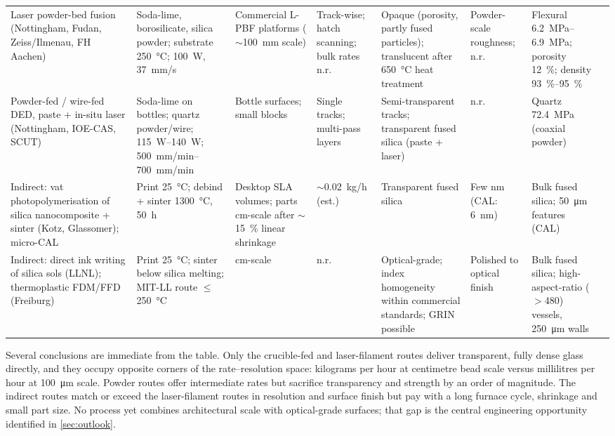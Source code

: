\begin{table}
\begin{tabular}{@{}L{2.6cm}L{2.3cm}L{2.4cm}L{2.5cm}L{2.6cm}L{2.5cm}L{3.0cm}L{2.2cm}@{}}
    Laser powder-bed fusion (Nottingham, Fudan, Zeiss/Ilmenau, FH Aachen) & Soda-lime, borosilicate, silica powder; substrate \SI{250}{\celsius}; \SI{100}{W}, \SI{37}{mm/s} & Commercial L-PBF platforms (\(\sim\)\SI{100}{mm} scale) & Track-wise; hatch scanning; bulk rates n.r. & Opaque (porosity, partly fused particles); translucent after \SI{650}{\celsius} heat treatment & Powder-scale roughness; n.r. & Flexural \SIrange{6.2}{6.9}{MPa}; porosity \SI{12}{\percent}; density \SIrange{93}{95}{\percent} & \citep{datsiou2019,datsiou2021,slmirregular2023,boro2025laser,fateri2015}\\
    Powder-fed / wire-fed DED, paste + in-situ laser (Nottingham, IOE-CAS, SCUT) & Soda-lime on bottles; quartz powder/wire; \SIrange{115}{140}{W}; \SIrange{500}{700}{mm/min} & Bottle surfaces; small blocks & Single tracks; multi-pass layers & Semi-transparent tracks; transparent fused silica (paste + laser) & n.r. & Quartz \SI{72.4}{MPa} (coaxial powder) & \citep{spirrett2023,lang2024,lgd2025tempctrl,paste2024,ieee2019dlm}\\
    \midrule
    Indirect: vat photopolymerisation of silica nanocomposite + sinter (Kotz, Glassomer); micro-CAL & Print \SI{25}{\celsius}; debind + sinter \SI{1300}{\celsius}, \SI{50}{h} & Desktop SLA volumes; parts cm-scale after \(\sim\)\SI{15}{\percent} linear shrinkage & \(\sim\)\SI{0.02}{kg/h} (est.) & Transparent fused silica & Few nm (CAL: \SI{6}{nm}) & Bulk fused silica; \SI{50}{\micro\metre} features (CAL) & \citep{kotz2017,toombs2022,inamura2018}\\
    Indirect: direct ink writing of silica sols (LLNL); thermoplastic FDM/FFD (Freiburg) & Print \SI{25}{\celsius}; sinter below silica melting; MIT-LL route \(\le\)\SI{250}{\celsius} & cm-scale & n.r. & Optical-grade; index homogeneity within commercial standards; GRIN possible & Polished to optical finish & Bulk fused silica; high-aspect-ratio (\(>\)480) vessels, \SI{250}{\micro\metre} walls & \citep{nguyen2017,destino2018,mader2021,acers2024recent}\\
    \bottomrule
  \end{tabular}
\end{table}

Several conclusions are immediate from the table. Only the crucible-fed and laser-filament routes deliver transparent, fully dense glass directly, and they occupy opposite corners of the rate--resolution space: kilograms per hour at centimetre bead scale versus millilitres per hour at \SI{100}{\micro\metre} scale. Powder routes offer intermediate rates but sacrifice transparency and strength by an order of magnitude. The indirect routes match or exceed the laser-filament routes in resolution and surface finish but pay with a long furnace cycle, shrinkage and small part size. No process yet combines architectural scale with optical-grade surfaces; that gap is the central engineering opportunity identified in \cref{sec:outlook}.
